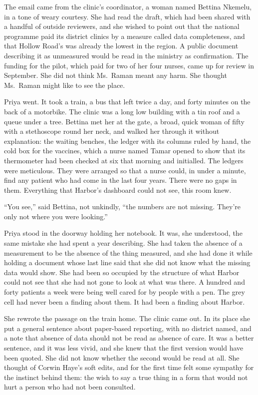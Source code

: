 The email came from the clinic's coordinator, a woman named Bettina Nkemelu, in a tone of weary courtesy. She had read the draft, which had been shared with a handful of outside reviewers, and she wished to point out that the national programme paid its district clinics by a measure called data completeness, and that Hollow Road's was already the lowest in the region. A public document describing it as unmeasured would be read in the ministry as confirmation. The funding for the pilot, which paid for two of her four nurses, came up for review in September. She did not think Ms.~Raman meant any harm. She thought Ms.~Raman might like to see the place.

Priya went. It took a train, a bus that left twice a day, and forty minutes on the back of a motorbike. The clinic was a long low building with a tin roof and a queue under a tree. Bettina met her at the gate, a broad, quick woman of fifty with a stethoscope round her neck, and walked her through it without explanation: the waiting benches, the ledger with its columns ruled by hand, the cold box for the vaccines, which a nurse named Tamar opened to show that its thermometer had been checked at six that morning and initialled. The ledgers were meticulous. They were arranged so that a nurse could, in under a minute, find any patient who had come in the last four years. There were no gaps in them. Everything that Harbor's dashboard could not see, this room knew.

``You see,'' said Bettina, not unkindly, ``the numbers are not missing. They're only not where you were looking.''

Priya stood in the doorway holding her notebook. It was, she understood, the same mistake she had spent a year describing. She had taken the absence of a measurement to be the absence of the thing measured, and she had done it while holding a document whose last line said that she did not know what the missing data would show. She had been so occupied by the structure of what Harbor could not see that she had not gone to look at what was there. A hundred and forty patients a week were being well cared for by people with a pen. The grey cell had never been a finding about them. It had been a finding about Harbor.

She rewrote the passage on the train home. The clinic came out. In its place she put a general sentence about paper-based reporting, with no district named, and a note that absence of data should not be read as absence of care. It was a better sentence, and it was less vivid, and she knew that the first version would have been quoted. She did not know whether the second would be read at all. She thought of Corwin Haye's soft edits, and for the first time felt some sympathy for the instinct behind them: the wish to say a true thing in a form that would not hurt a person who had not been consulted.

